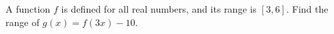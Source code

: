 A function $f$ is defined for all real numbers, and its range is $[3,6]$. Find the range of $g(x)=f(3x)-10$.
